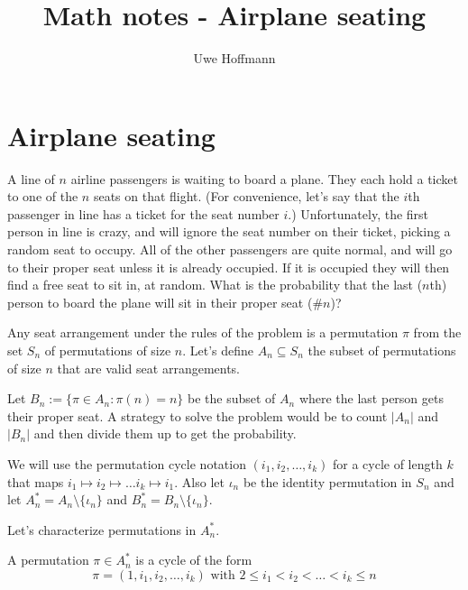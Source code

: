 

\title{Math notes - Airplane seating}
\author{Uwe Hoffmann}



\setcounter{chapter}{1}
\section*{Airplane seating}

\vspace{10 mm}
\begin{problem}
 A line of $n$ airline passengers is waiting to board a plane. They each hold a ticket to one of the $n$ seats on that flight. (For convenience, let's say that the $i$th passenger in line has a ticket for the seat number $i$.) Unfortunately, the first person in line is crazy, and will ignore the seat number on their ticket, picking a random seat to occupy. All of the other passengers are quite normal, and will go to their proper seat unless it is already occupied. If it is occupied they will then find a free seat to sit in, at random. What is the probability that the last ($n$th)
person to board the plane will sit in their proper seat (\#$n$)?
\end{problem}

Any seat arrangement under the rules of the problem is a permutation $\pi$ from the set $S_n$ of permutations of size $n$. Let's define $A_n \subseteq S_n$ the subset of permutations of size $n$ that are valid seat arrangements. 

Let $B_n := \{\pi \in A_n: \pi(n) = n\}$ be the subset of $A_n$ where the last person gets their proper seat. A strategy to solve the problem would be to count $|A_n|$ and $|B_n|$ and then divide them up to get the probability. 

We will use the permutation cycle notation $(i_1,i_2,\ldots,i_k)$ for a cycle of length $k$ that maps $i_1 \mapsto i_2 \mapsto \ldots i_k\mapsto i_1$. Also let $\iota_n$ be the identity permutation in $S_n$ and let $A_n^* = A_n \setminus \{\iota_n\}$ and $B_n^* = B_n \setminus \{\iota_n\}$.

Let's characterize permutations in $A_n^*$.

\begin{lem}\label{a_n}
A permutation $\pi \in A_n^*$ is a cycle of the form
\begin{equation*}
\pi = (1, i_1, i_2,\ldots, i_k)  \text{ with } 2 \leq i_1 < i_2 < \ldots < i_k \leq n
\end{equation*}  
\end{lem}

